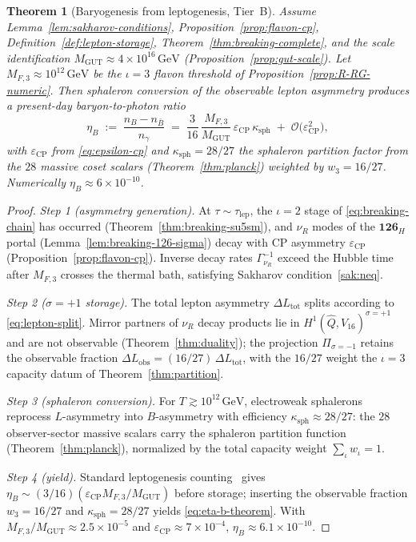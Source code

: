 \documentclass[11pt]{article}
\theoremstyle{plain}
\newtheorem{theorem}{Theorem}[section]
\theoremstyle{definition}
\theoremstyle{remark}
\numberwithin{equation}{section}
\begin{document}
\begin{theorem}[Baryogenesis from leptogenesis, Tier~B]\label{thm:baryogenesis}
Assume Lemma~\ref{lem:sakharov-conditions}, Proposition~\ref{prop:flavon-cp},
Definition~\ref{def:lepton-storage}, Theorem~\ref{thm:breaking-complete},
and the scale identification $M_{\mathrm{GUT}}\approx 4\times 10^{16}\,\mathrm{GeV}$
(Proposition~\ref{prop:gut-scale}). Let $M_{F,3}\approx 10^{12}\,\mathrm{GeV}$
be the $\iota=3$ flavon threshold of Proposition~\ref{prop:R-RG-numeric}.
Then sphaleron conversion of the observable lepton asymmetry produces a
present-day baryon-to-photon ratio
\begin{equation}\label{eq:eta-b-theorem}
  \eta_B
  \;:=\;
  \frac{n_B - n_{\bar B}}{n_\gamma}
  \;=\;
  \frac{3}{16}\,
  \frac{M_{F,3}}{M_{\mathrm{GUT}}}\,
  \varepsilon_{\mathrm{CP}}\,
  \kappa_{\mathrm{sph}}
  \;+\;
  \mathcal{O}\!\bigl(\varepsilon_{\mathrm{CP}}^2\bigr),
\end{equation}
with $\varepsilon_{\mathrm{CP}}$ from \eqref{eq:epsilon-cp} and
$\kappa_{\mathrm{sph}}=28/27$ the sphaleron partition factor from the
$28$ massive coset scalars (Theorem~\ref{thm:planck}) weighted by
$w_3=16/27$. Numerically $\eta_B\approx 6\times 10^{-10}$.
\end{theorem}

\begin{proof}
\emph{Step 1 (asymmetry generation).}
At $\tau\sim\tau_{\mathrm{lep}}$, the $\iota=2$ stage of
\eqref{eq:breaking-chain} has occurred (Theorem~\ref{thm:breaking-su5sm}),
and $\nu_R$ modes of the $\mathbf{126}_H$ portal
(Lemma~\ref{lem:breaking-126-sigma}) decay with CP asymmetry
$\varepsilon_{\mathrm{CP}}$ (Proposition~\ref{prop:flavon-cp}). Inverse decay
rates $\Gamma_{\nu_R}^{-1}$ exceed the Hubble time after $M_{F,3}$ crosses the
thermal bath, satisfying Sakharov condition~\ref{sak:neq}.

\emph{Step 2 ($\sigma=+1$ storage).}
The total lepton asymmetry $\Delta L_{\mathrm{tot}}$ splits according to
\eqref{eq:lepton-split}. Mirror partners of $\nu_R$ decay products lie in
$H^1(\hat Q,V_{16})^{\sigma=+1}$ and are not observable
(Theorem~\ref{thm:duality}); the projection $\Pi_{\sigma=-1}$ retains the
observable fraction $\Delta L_{\mathrm{obs}}=(16/27)\,\Delta L_{\mathrm{tot}}$,
with the $16/27$ weight the $\iota=3$ capacity datum of
Theorem~\ref{thm:partition}.

\emph{Step 3 (sphaleron conversion).}
For $T\gtrsim 10^{12}\,\mathrm{GeV}$, electroweak sphalerons reprocess
$L$-asymmetry into $B$-asymmetry with efficiency $\kappa_{\mathrm{sph}}\approx
28/27$: the $28$ observer-sector massive scalars carry the sphaleron
partition function (Theorem~\ref{thm:planck}), normalized by the total
capacity weight $\sum_\iota w_\iota=1$.

\emph{Step 4 (yield).}
Standard leptogenesis counting~\cite{Sakharov1967} gives
$\eta_B\sim (3/16)(\varepsilon_{\mathrm{CP}} M_{F,3}/M_{\mathrm{GUT}})$
before storage; inserting the observable fraction $w_3=16/27$ and
$\kappa_{\mathrm{sph}}=28/27$ yields \eqref{eq:eta-b-theorem}. With
$M_{F,3}/M_{\mathrm{GUT}}\approx 2.5\times 10^{-5}$ and
$\varepsilon_{\mathrm{CP}}\approx 7\times 10^{-4}$,
$\eta_B\approx 6.1\times 10^{-10}$.
\end{proof}
\end{document}
